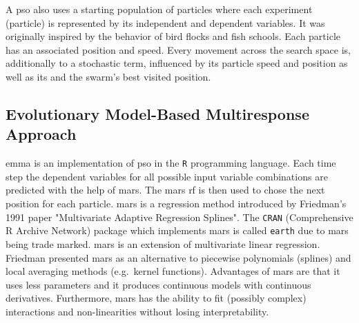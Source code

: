 A \gls{pso} also uses a starting population of particles where each experiment (particle) 
is represented by its independent and dependent variables. 
It was originally inspired by the behavior of bird flocks and fish schools\cite{villanova2010function,Kennedy1995}.
Each particle has an associated position and speed. 
Every movement across the search space is, 
additionally to a stochastic term, 
influenced by its particle speed and position as well as its and the swarm's best visited position.


\subsection{Evolutionary Model-Based Multiresponse Approach}
\Gls{emma} is an implementation of \gls{pso} in the \texttt{R} programming language. 
Each time step the dependent variables for all possible input variable combinations %
are predicted with the help of \gls{mars}. 
The \gls{mars} \gls{rf} is then used to chose the next position for each particle.
\Gls{mars} is a regression method introduced by Friedman's 1991 paper 
"Multivariate Adaptive Regression Splines"\cite{friedman1991multivariate}. 
The \texttt{CRAN} (Comprehensive R Archive Network) package which implements \gls{mars} is called \texttt{earth} due to \gls{mars} being trade marked\cite{mars}.
\gls{mars} is an extension of multivariate linear regression.
Friedman presented \gls{mars} as an alternative to piecewise polynomials (splines) and local averaging methods (e.g.\ kernel functions). %
Advantages of \Gls{mars} are that it uses less parameters and it produces continuous models with continuous derivatives.
%
%
Furthermore, \gls{mars} has the ability to fit (possibly complex) interactions and non-linearities without losing interpretability. 
%
%

